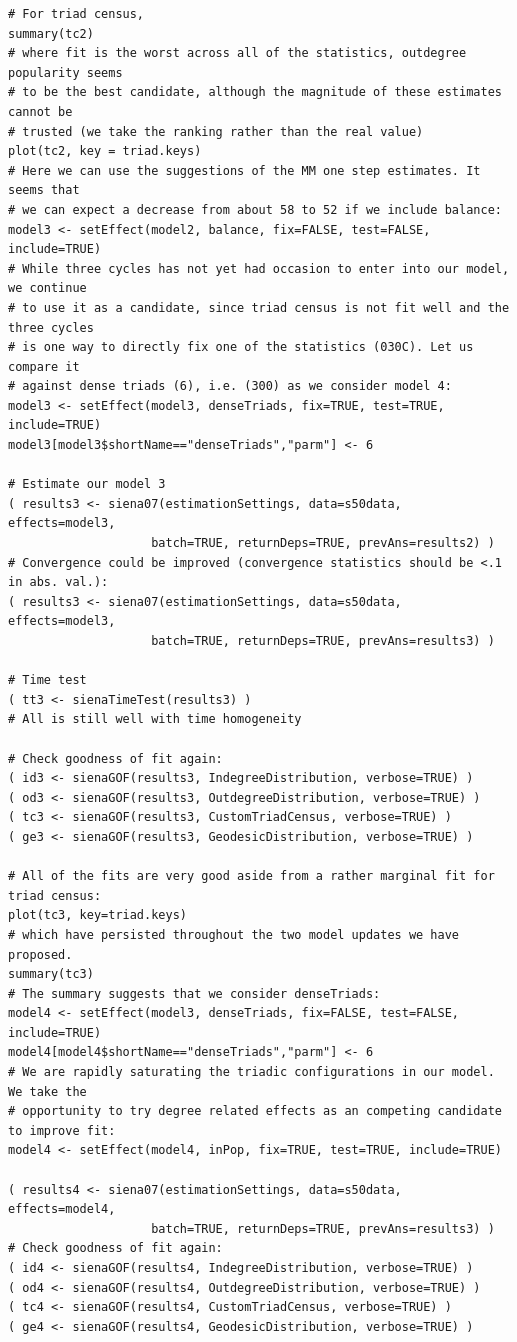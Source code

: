 \documentclass[a4paper,fleqn,11pt]{article}
\newcommand{\+}{\, + \,}
\begin{document}
{\begin{footnotesize}
\begin{verbatim}
# For triad census,
summary(tc2)
# where fit is the worst across all of the statistics, outdegree popularity seems
# to be the best candidate, although the magnitude of these estimates cannot be
# trusted (we take the ranking rather than the real value)
plot(tc2, key = triad.keys)
# Here we can use the suggestions of the MM one step estimates. It seems that
# we can expect a decrease from about 58 to 52 if we include balance:
model3 <- setEffect(model2, balance, fix=FALSE, test=FALSE, include=TRUE)
# While three cycles has not yet had occasion to enter into our model, we continue
# to use it as a candidate, since triad census is not fit well and the three cycles
# is one way to directly fix one of the statistics (030C). Let us compare it
# against dense triads (6), i.e. (300) as we consider model 4:
model3 <- setEffect(model3, denseTriads, fix=TRUE, test=TRUE, include=TRUE)
model3[model3$shortName=="denseTriads","parm"] <- 6

# Estimate our model 3
( results3 <- siena07(estimationSettings, data=s50data, effects=model3,
					batch=TRUE, returnDeps=TRUE, prevAns=results2) )
# Convergence could be improved (convergence statistics should be <.1 in abs. val.):
( results3 <- siena07(estimationSettings, data=s50data, effects=model3,
					batch=TRUE, returnDeps=TRUE, prevAns=results3) )

# Time test
( tt3 <- sienaTimeTest(results3) )
# All is still well with time homogeneity

# Check goodness of fit again:
( id3 <- sienaGOF(results3, IndegreeDistribution, verbose=TRUE) )
( od3 <- sienaGOF(results3, OutdegreeDistribution, verbose=TRUE) )
( tc3 <- sienaGOF(results3, CustomTriadCensus, verbose=TRUE) )
( ge3 <- sienaGOF(results3, GeodesicDistribution, verbose=TRUE) )

# All of the fits are very good aside from a rather marginal fit for triad census:
plot(tc3, key=triad.keys)
# which have persisted throughout the two model updates we have proposed.
summary(tc3)
# The summary suggests that we consider denseTriads:
model4 <- setEffect(model3, denseTriads, fix=FALSE, test=FALSE, include=TRUE)
model4[model4$shortName=="denseTriads","parm"] <- 6
# We are rapidly saturating the triadic configurations in our model. We take the
# opportunity to try degree related effects as an competing candidate to improve fit:
model4 <- setEffect(model4, inPop, fix=TRUE, test=TRUE, include=TRUE)

( results4 <- siena07(estimationSettings, data=s50data, effects=model4,
					batch=TRUE, returnDeps=TRUE, prevAns=results3) )
# Check goodness of fit again:
( id4 <- sienaGOF(results4, IndegreeDistribution, verbose=TRUE) )
( od4 <- sienaGOF(results4, OutdegreeDistribution, verbose=TRUE) )
( tc4 <- sienaGOF(results4, CustomTriadCensus, verbose=TRUE) )
( ge4 <- sienaGOF(results4, GeodesicDistribution, verbose=TRUE) )


\end{verbatim}
\end{footnotesize}}
\end{document}
